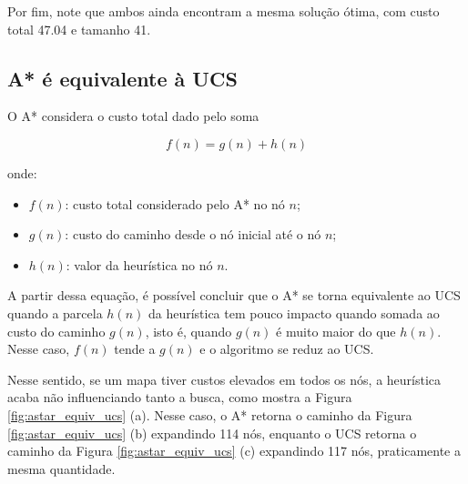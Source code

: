 \documentclass[letterpaper]{article} %
\begin{document}
Por fim, note que ambos ainda encontram a mesma solução ótima, com custo total 47.04 e tamanho 41.



\subsection{A* é equivalente à UCS}

O A* considera o custo total dado pelo soma 

\[ f(n) = g(n) + h(n)  \]

\noindent onde:

\begin{itemize}
	\item $f(n)$: custo total considerado pelo A* no nó $n$;
	\item $g(n)$: custo do caminho desde o nó inicial até o nó $n$;
	\item $h(n)$: valor da heurística no nó $n$.
\end{itemize}

A partir dessa equação, é possível concluir que o A* se torna equivalente ao UCS quando a parcela
$h(n)$ da heurística tem pouco 
impacto quando somada ao custo do caminho $g(n)$, isto é, quando $g(n)$ é muito maior do que $h(n)$.
Nesse caso, $f(n)$ tende a $g(n)$ e o algoritmo se reduz ao UCS. 

Nesse sentido, se um mapa tiver custos elevados 
em todos os nós, a heurística acaba não influenciando tanto a busca, como mostra a
Figura \ref{fig:astar_equiv_ucs} (a). Nesse caso, o A* retorna o caminho da Figura 
\ref{fig:astar_equiv_ucs} (b) expandindo 114 nós, enquanto o UCS retorna o caminho da 
Figura \ref{fig:astar_equiv_ucs} (c) expandindo 117 nós, praticamente a mesma quantidade.
\end{document}
